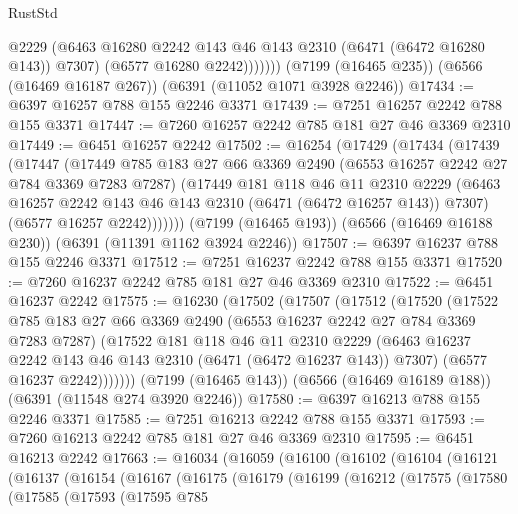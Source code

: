 \begin{lexlean}{RustStd}
\begin{coremodule}
                @2229
                (@6463 @16280 @2242 @143 @46 @143 @2310 (@6471 (@6472 @16280 @143)) @7307)
                (@6577 @16280 @2242)))))))
    (@7199 (@16465 @235))
    (@6566 (@16469 @16187 @267))
    (@6391 (@11052 @1071 @3928 @2246))
@17434 := @6397 @16257 @788 @155 @2246 @3371
@17439 := @7251 @16257 @2242 @788 @155 @3371
@17447 := @7260 @16257 @2242 @785 @181 @27 @46 @3369 @2310
@17449 := @6451 @16257 @2242
@17502 := @16254
    (@17429
      (@17434
        (@17439
          (@17447
            (@17449
              @785
              @183
              @27
              @66
              @3369
              @2490
              (@6553 @16257 @2242 @27 @784 @3369 @7283 @7287)
              (@17449
                @181
                @118
                @46
                @11
                @2310
                @2229
                (@6463 @16257 @2242 @143 @46 @143 @2310 (@6471 (@6472 @16257 @143)) @7307)
                (@6577 @16257 @2242)))))))
    (@7199 (@16465 @193))
    (@6566 (@16469 @16188 @230))
    (@6391 (@11391 @1162 @3924 @2246))
@17507 := @6397 @16237 @788 @155 @2246 @3371
@17512 := @7251 @16237 @2242 @788 @155 @3371
@17520 := @7260 @16237 @2242 @785 @181 @27 @46 @3369 @2310
@17522 := @6451 @16237 @2242
@17575 := @16230
    (@17502
      (@17507
        (@17512
          (@17520
            (@17522
              @785
              @183
              @27
              @66
              @3369
              @2490
              (@6553 @16237 @2242 @27 @784 @3369 @7283 @7287)
              (@17522
                @181
                @118
                @46
                @11
                @2310
                @2229
                (@6463 @16237 @2242 @143 @46 @143 @2310 (@6471 (@6472 @16237 @143)) @7307)
                (@6577 @16237 @2242)))))))
    (@7199 (@16465 @143))
    (@6566 (@16469 @16189 @188))
    (@6391 (@11548 @274 @3920 @2246))
@17580 := @6397 @16213 @788 @155 @2246 @3371
@17585 := @7251 @16213 @2242 @788 @155 @3371
@17593 := @7260 @16213 @2242 @785 @181 @27 @46 @3369 @2310
@17595 := @6451 @16213 @2242
@17663 := @16034
    (@16059
      (@16100
        (@16102
          (@16104
            (@16121
              (@16137
                (@16154
                  (@16167
                    (@16175
                      (@16179
                        (@16199
                          (@16212
                            (@17575
                              (@17580
                                (@17585
                                  (@17593
                                    (@17595
                                      @785

\end{coremodule}
\end{lexlean}
